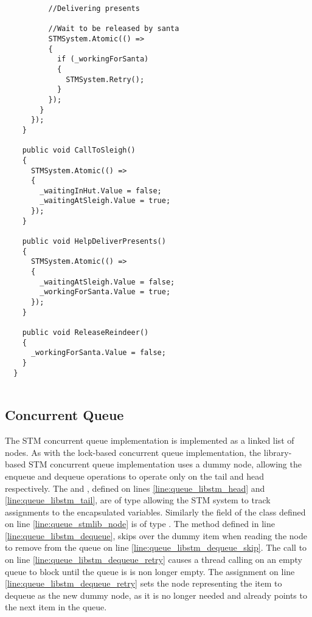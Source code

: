 \begin{lstlisting}
          //Delivering presents

          //Wait to be released by santa
          STMSystem.Atomic(() =>
          {
            if (_workingForSanta)
            {
              STMSystem.Retry();
            }
          });   
        }
      });
    }

    public void CallToSleigh()
    {
      STMSystem.Atomic(() =>
      {
        _waitingInHut.Value = false;
        _waitingAtSleigh.Value = true;
      });
    }

    public void HelpDeliverPresents()
    {
      STMSystem.Atomic(() =>
      {
        _waitingAtSleigh.Value = false;
        _workingForSanta.Value = true;
      });
    }

    public void ReleaseReindeer()
    {
      _workingForSanta.Value = false;
    }
  }
  
\end{lstlisting}
\subsection{Concurrent Queue}
The \ac{STM} concurrent queue implementation is implemented as a linked list of nodes. As with the lock-based concurrent queue implementation, the library-based \ac{STM} concurrent queue implementation uses a dummy node, allowing the enqueue and dequeue operations to operate only on the tail and head respectively. The  and , defined on lines \ref{line:queue_libstm_head} and \ref{line:queue_libstm_tail}, are of type  allowing the \ac{STM} system to track assignments to the encapsulated variables. Similarly the  field of the  class defined on line \ref{line:queue_stmlib_node} is of type . The  method defined in line \ref{line:queue_libstm_dequeue}, skips over the dummy item when reading the node to remove from the queue on line \ref{line:queue_libstm_dequeue_skip}. The call to  on line \ref{line:queue_libstm_dequeue_retry} causes a thread calling  on an empty queue to block until the queue is is non longer empty. The assignment on line \ref{line:queue_libstm_dequeue_retry} sets the node representing the item to dequeue as the new dummy node, as it is no longer needed and already points to the next item in the queue. 

